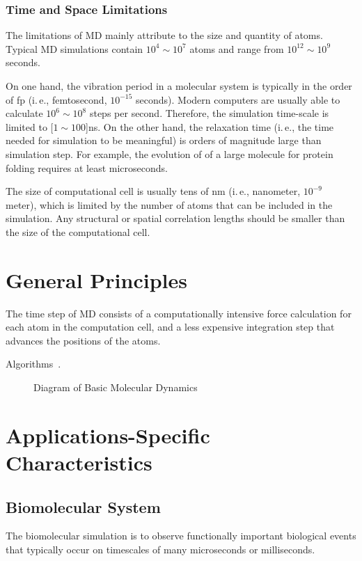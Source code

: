 \documentclass[a4paper,10pt,technote,compsoc,onecolumn]{IEEEtran}
\newcommand{\ie}{i.\,e., }
\numberwithin{equation}{section}
\begin{document}
\subsubsection{Time and Space Limitations}
The limitations of \ac{MD} mainly attribute to the size and quantity of
atoms. Typical \ac{MD} simulations contain $10^4\sim 10^7$ atoms and range 
from $10^{12}\sim 10^9$ seconds.

On one hand, the vibration period in a molecular system is typically in the
order of fp (\ie femtosecond, $10^{-15}$ seconds). Modern computers are 
usually able to calculate $10^6\sim10^8$ steps per second. Therefore, 
the simulation time-scale is limited to \unit[$1\sim100$]{ns}. On the other hand, the relaxation time (\ie the time needed for simulation to be meaningful) is orders of magnitude large than simulation step. For example, the evolution of of a large molecule for protein folding requires at least microseconds.

The size of computational cell is usually tens of nm (\ie nanometer, $10^{-9}$
meter), which is limited by the number of atoms that can be included in the
simulation. Any structural or spatial correlation lengths should be smaller
than the size of the computational cell.

\section{General Principles}

The time step of \ac{MD} consists of a computationally intensive force
calculation for each atom in the computation cell, and a less expensive
integration step that advances the positions of the atoms.

Algorithms~\cite{greengard87jcp}.

\begin{figure}[htp]
\centering

\caption{Diagram of Basic Molecular Dynamics}
\label{fig:md_flow}
\end{figure}

\section{Applications-Specific Characteristics}

\subsection{Biomolecular System}
The biomolecular simulation is to observe functionally important biological
events that typically occur on timescales of many microseconds or milliseconds.
\end{document}

